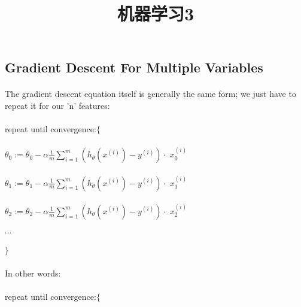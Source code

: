 \documentclass{article}
\begin{document}
\begin{CJK}{UTF8}{gbsn}
\title{机器学习3}
\date{}
\maketitle
\section{Gradient Descent For Multiple Variables}
\paragraph{}
The gradient descent equation itself is generally the same form; we just have to repeat it for our 'n' features:
\begin{algorithm} 
\paragraph{}
repeat until convergence:$\lbrace$
\paragraph{}
$\theta_{0}:=\theta_{0}-\alpha\frac{1}{m}\sum\limits_{i=1}^{m}(h_{\theta}(x^{(i)})-y^{(i)})\cdot$ $x^{(i)}_{0}$
\paragraph{}
$\theta_{1}:=\theta_{1}-\alpha\frac{1}{m}\sum\limits_{i=1}^{m}(h_{\theta}(x^{(i)})-y^{(i)})\cdot$ $x^{(i)}_{1}$
\paragraph{}
$\theta_{2}:=\theta_{2}-\alpha\frac{1}{m}\sum\limits_{i=1}^{m}(h_{\theta}(x^{(i)})-y^{(i)})\cdot$ $x^{(i)}_{2}$
\paragraph{}
$\cdots$
\paragraph{}
$\rbrace$
\end{algorithm}
\paragraph{}
In other words:
\begin{algorithm}
\paragraph{}
repeat until convergence:$\lbrace$

\end{algorithm}
\end{CJK}
\end{document}
